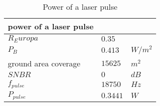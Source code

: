 \begin{table}[H]
\centering
\caption{Power of a laser pulse}
\label{tab:p_pulse}
\begin{tabular}{|l|ll|} \hline
\textbf{power of a laser pulse}  &              &      \\ \hline
$R_Europa$                       & $0.35        $&      \\
$P_B      $                      & $0.413       $&$ W/m^2 $\\
ground area coverage             & $15625       $&$ m^2   $\\
$SNBR      $                     & $0           $&$ dB   $\\
$f_{pulse}    $                    & $18750       $&$ Hz   $\\
$P_{pulse}     $                   & $0.3441 $&$ W    $\\ \hline
\end{tabular}
\end{table}